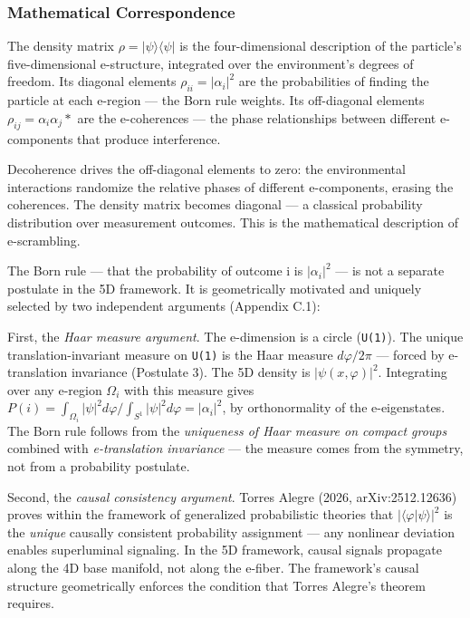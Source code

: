 \documentclass[aps,prd,preprint,superscriptaddress,longbibliography,floatfix]{revtex4-2}
\theoremstyle{remark}
\begin{document}
\subsubsection{Mathematical Correspondence}

The density matrix $\rho = |\psi\rangle\langle\psi|$ is the four-dimensional description of the particle's five-dimensional e-structure, integrated over the environment's degrees of freedom. Its diagonal elements $\rho_{ii} = |\alpha_{i}|^{2}$ are the probabilities of finding the particle at each e-region --- the Born rule weights. Its off-diagonal elements $\rho_{ij} = \alpha_{i}\alpha_{j}*$ are the e-coherences --- the phase relationships between different e-components that produce interference.

Decoherence drives the off-diagonal elements to zero: the environmental interactions randomize the relative phases of different e-components, erasing the coherences. The density matrix becomes diagonal --- a classical probability distribution over measurement outcomes. This is the mathematical description of e-scrambling.

The Born rule --- that the probability of outcome i is $|\alpha_{i}|^{2}$ --- is not a separate postulate in the 5D framework. It is geometrically motivated and uniquely selected by two independent arguments (Appendix C.1):

First, the \textit{Haar measure argument}. The e-dimension is a circle (\texttt{U(1)}). The unique translation-invariant measure on \texttt{U(1)} is the Haar measure $d\varphi/2\pi$ --- forced by e-translation invariance (Postulate 3). The 5D density is $|\psi(x, \varphi)|^{2}$. Integrating over any e-region $\Omega_{i}$ with this measure gives $P(i) = \int_{\Omega_{i}} |\psi|^{2} d\varphi / \int_{S^{1}} |\psi|^{2} d\varphi = |\alpha_{i}|^{2}$, by orthonormality of the e-eigenstates. The Born rule follows from the \textit{uniqueness of Haar measure on compact groups} combined with \textit{e-translation invariance} --- the measure comes from the symmetry, not from a probability postulate.

Second, the \textit{causal consistency argument}. Torres Alegre (2026, arXiv:2512.12636) proves within the framework of generalized probabilistic theories that $|\langle\varphi|\psi\rangle|^{2}$ is the \textit{unique} causally consistent probability assignment --- any nonlinear deviation enables superluminal signaling. In the 5D framework, causal signals propagate along the 4D base manifold, not along the e-fiber. The framework's causal structure geometrically enforces the condition that Torres Alegre's theorem requires.
\end{document}
